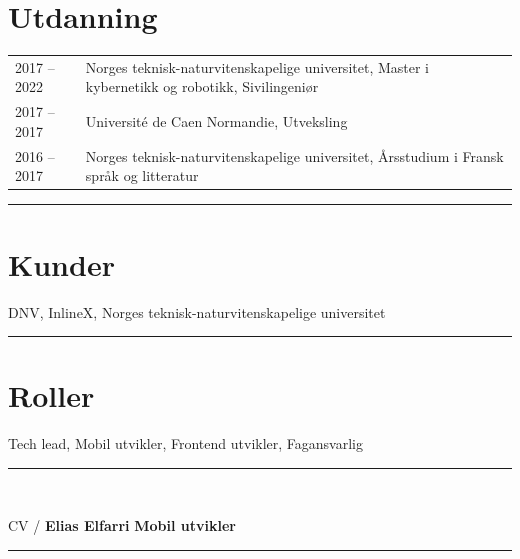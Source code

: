\documentclass[a4paper,10pt]{article}
\begin{document}
\begin{paracol}{2}
\section{\ubuntu Utdanning}
\renewcommand{\arraystretch}{1.3} %
\begin{tabularx}{\columnwidth}{@{}l>{\raggedright\arraybackslash}X@{}}
2017 -- 2022 & Norges teknisk-naturvitenskapelige universitet, Master i kybernetikk og robotikk, Sivilingeniør \\
2017 -- 2017 & Université de Caen Normandie, Utveksling \\
2016 -- 2017 & Norges teknisk-naturvitenskapelige universitet, Årsstudium i Fransk språk og litteratur \\
\end{tabularx}

\vspace{0.5em} 
\noindent\rule{\linewidth}{0.2pt}


\section{\ubuntu Kunder}
DNV, \hspace{0.1em} 
InlineX, \hspace{0.1em} 
Norges teknisk-naturvitenskapelige
universitet

\vspace{0.5em} 
\noindent\rule{\linewidth}{0.2pt}

\section{\ubuntu Roller}
Tech lead, \hspace{0.1em}
Mobil utvikler, \hspace{0.1em}
Frontend utvikler, \hspace{0.1em}
Fagansvarlig

\end{paracol}

\vfill
\noindent\rule{\linewidth}{0.5pt}\\
\hfill 

\newpage
\noindent CV / \textbf{Elias Elfarri} \hfill \textbf{Mobil utvikler} \\
\rule{\linewidth}{0.5pt}

  

\end{document}
